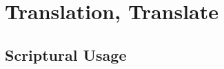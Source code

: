 \section{Translation, Translate}
	\label{TRANSLATION}
	





\subsection{Scriptural Usage} %
	\label{TRANSLATION-SCRIPTURES}

	
	
